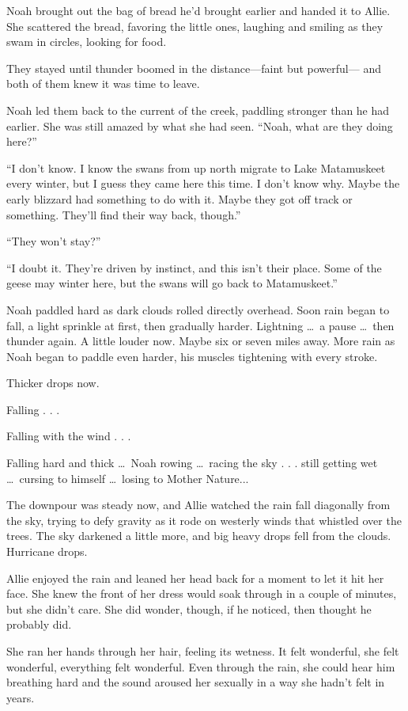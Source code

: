 \documentclass[10pt, twoside, openright]{book}
\begin{document}
Noah brought out the bag of bread he'd brought earlier and handed it to
Allie. She scattered the bread, favoring the little ones, laughing and
smiling as they swam in circles, looking for food.

They stayed until thunder boomed in the distance---faint but powerful---
and both of them knew it was time to leave.

Noah led them back to the current of the creek, paddling stronger than
he had earlier. She was still amazed by what she had seen. ``Noah, what
are they doing here?''

``I don't know. I know the swans from up north migrate to Lake
Matamuskeet every winter, but I guess they came here this time. I don't
know why. Maybe the early blizzard had something to do with it. Maybe
they got off track or something. They'll find their way back, though.''


``They won't stay?''


``I doubt it. They're driven by instinct, and this isn't their place.
Some of the geese may winter here, but the swans will go back to
Matamuskeet.''

Noah paddled hard as dark clouds rolled directly overhead. Soon rain
began to fall, a light sprinkle at first, then gradually harder.
Lightning \dots\ a pause   \dots\ then thunder again. A little louder now.
Maybe six or seven miles away. More rain as Noah began to paddle even
harder, his muscles tightening with every stroke.


Thicker drops now.

Falling . . .

Falling with the wind . . .


Falling hard and thick   \dots\ Noah rowing   \dots\ racing the sky . . .
still getting wet   \dots\ cursing to himself   \dots\ losing to Mother
Nature...

The downpour was steady now, and Allie watched the rain fall diagonally
from the sky, trying to defy gravity as it rode on westerly winds that
whistled over the trees. The sky darkened a little more, and big heavy
drops fell from the clouds. Hurricane drops.

Allie enjoyed the rain and leaned her head back for a moment to let it
hit her face. She knew the front of her dress would soak through in a
couple of minutes, but she didn't care. She did wonder, though, if he
noticed, then thought he probably did.

She ran her hands through her hair, feeling its wetness. It felt
wonderful, she felt wonderful, everything felt wonderful. Even through
the rain, she could hear him breathing hard and the sound aroused her
sexually in a way she hadn't felt in years.
\end{document}
